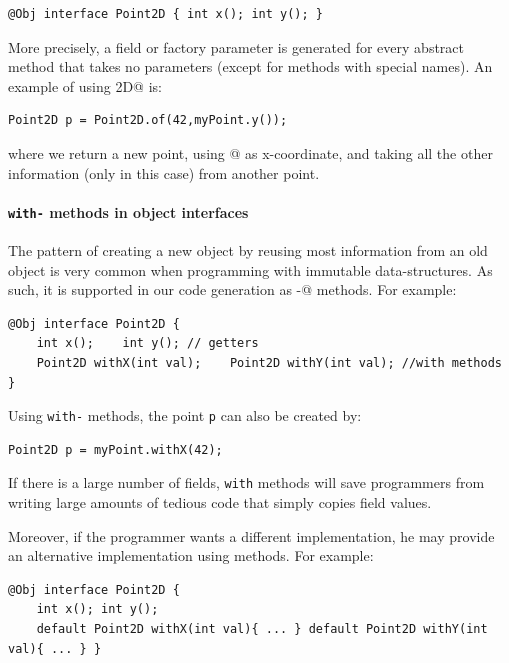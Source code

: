 \begin{lstlisting}
@Obj interface Point2D { int x(); int y(); }
\end{lstlisting}

\noindent More precisely, a field or factory parameter is generated for every
abstract method that takes no parameters (except for methods with special
names). An example of using \Q@Point2D@ is:
\begin{lstlisting}
Point2D p = Point2D.of(42,myPoint.y());
\end{lstlisting}
\noindent where we return a new point, using @ as x-coordinate,
and taking all the other information (only \Q@y@ in this case) from
another point.

\paragraph{\texttt{with-} methods in object interfaces}
The pattern of creating a new object by reusing most information from an old
object is very common when programming with immutable
data-structures. As such, it is
supported in our code generation as \Q@with-@ methods. For example:
\begin{lstlisting}
@Obj interface Point2D {
    int x();    int y(); // getters
    Point2D withX(int val);    Point2D withY(int val); //with methods 
}
\end{lstlisting}

\noindent Using \texttt{with-} methods, the point \texttt{p} can also be created
by:

\begin{lstlisting}
Point2D p = myPoint.withX(42);
\end{lstlisting}

\noindent If there is a large number of fields, \texttt{with} methods
will save programmers from writing large amounts of tedious code that
simply copies field values.

Moreover, if the programmer wants a different implementation, he may
provide an alternative implementation using \Q@default@ methods. For example:
\begin{lstlisting}
@Obj interface Point2D {
    int x(); int y();
    default Point2D withX(int val){ ... } default Point2D withY(int val){ ... } }
\end{lstlisting}

